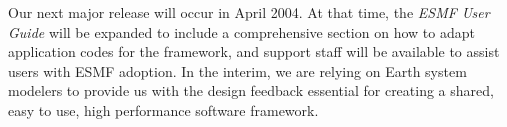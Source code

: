 Our next major release will occur in April 2004.  At that time, the {\it ESMF 
User Guide} will be expanded to include a comprehensive section on how to adapt 
application codes for the framework, and support staff will be available to 
assist users with ESMF adoption.  In the interim, we are relying on Earth
system modelers to provide us with the design feedback essential for creating a 
shared, easy to use, high performance software framework.  










